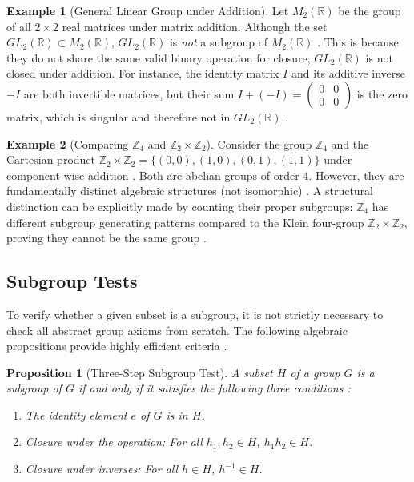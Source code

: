\documentclass[11pt]{article}
\theoremstyle{definition}
\newtheorem{example}{Example}[section]
\theoremstyle{plain}
\newtheorem{proposition}{Proposition}[theorem]
\theoremstyle{remark}
\begin{document}
\begin{example}[General Linear Group under Addition]
Let $M_2(\mathbb{R})$ be the group of all $2 \times 2$ real matrices under matrix addition. Although the set $GL_2(\mathbb{R}) \subset M_2(\mathbb{R})$, $GL_2(\mathbb{R})$ is \emph{not} a subgroup of $M_2(\mathbb{R})$ \cite{fraleigh}. This is because they do not share the same valid binary operation for closure; $GL_2(\mathbb{R})$ is not closed under addition. For instance, the identity matrix $I$ and its additive inverse $-I$ are both invertible matrices, but their sum $I + (-I) = \left(\begin{smallmatrix} 0 & 0 \\ 0 & 0 \end{smallmatrix}\right)$ is the zero matrix, which is singular and therefore not in $GL_2(\mathbb{R})$ \cite{dummit}.
\end{example}

\begin{example}[Comparing $\mathbb{Z}_4$ and $\mathbb{Z}_2 \times \mathbb{Z}_2$]
Consider the group $\mathbb{Z}_4$ and the Cartesian product $\mathbb{Z}_2 \times \mathbb{Z}_2 = \{(0,0), (1,0), (0,1), (1,1)\}$ under component-wise addition \cite{gallian}. Both are abelian groups of order 4. However, they are fundamentally distinct algebraic structures (not isomorphic) \cite{dummit}. A structural distinction can be explicitly made by counting their proper subgroups: $\mathbb{Z}_4$ has different subgroup generating patterns compared to the Klein four-group $\mathbb{Z}_2 \times \mathbb{Z}_2$, proving they cannot be the same group \cite{gallian}.
\end{example}

\subsection{Subgroup Tests}

To verify whether a given subset is a subgroup, it is not strictly necessary to check all abstract group axioms from scratch. The following algebraic propositions provide highly efficient criteria \cite{fraleigh}.

\begin{proposition}[Three-Step Subgroup Test]
A subset $H$ of a group $G$ is a subgroup of $G$ if and only if it satisfies the following three conditions \cite{dummit}:
\begin{enumerate}
    \item The identity element $e$ of $G$ is in $H$.
    \item Closure under the operation: For all $h_1, h_2 \in H$, $h_1 h_2 \in H$.
    \item Closure under inverses: For all $h \in H$, $h^{-1} \in H$.
\end{enumerate}
\end{proposition}
\end{document}
